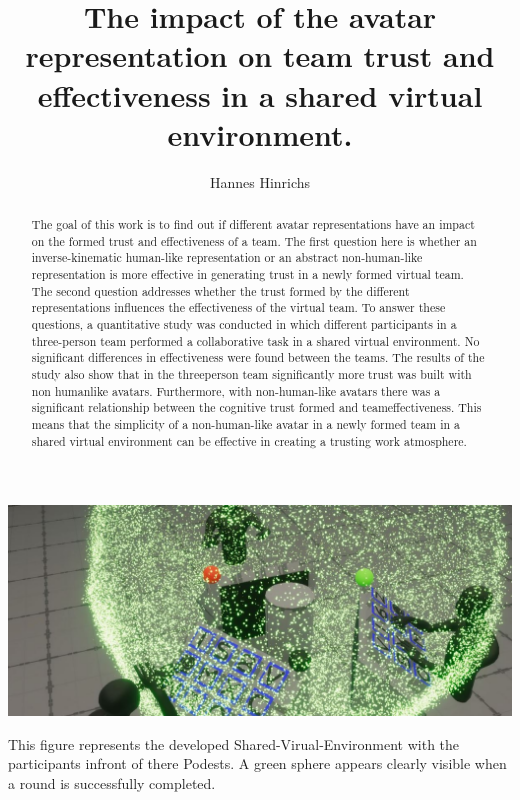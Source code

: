 \documentclass[sigchi]{acmart}
\begin{document}
\title{The impact of the avatar representation on team trust and effectiveness in a shared virtual environment.}

\author{Hannes Hinrichs}

\begin{abstract}
The goal of this work is to find out if different avatar representations have an impact on the formed trust and effectiveness of a team. The first question here is whether an inverse-kinematic human-like representation or an abstract non-human-like representation is more effective in generating trust in a newly formed virtual team. The second question addresses whether the trust formed by the different representations influences the effectiveness of the virtual team. To answer these questions, a quantitative study was conducted in which different participants in a three-person team performed a collaborative task in a shared virtual environment. No significant differences in effectiveness were found between the teams. The results of the study also show that in the threeperson team significantly more trust was built with non humanlike avatars. Furthermore, with non-human-like avatars there was a significant relationship between the cognitive trust formed and teameffectiveness. This means that the simplicity of a non-human-like avatar in a newly formed team in a shared virtual environment can be effective in creating a trusting work atmosphere.
\end{abstract}


\begin{teaserfigure}
  \includegraphics[width=\textwidth]{Abbildungen/RoundSuccsessful2}
  \caption{This figure represents the developed Shared-Virual-Environment with the participants infront of there Podests. A green sphere appears clearly visible when a round is successfully completed.}
  \label{fig:teaser}
\end{teaserfigure}
\end{document}
